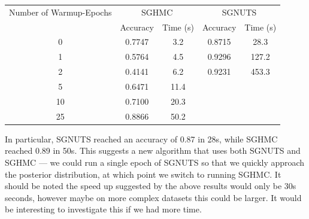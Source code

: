 \begin{center}
\begin{tabular}{ccccc} 
\hline
Number of Warmup-Epochs &\multicolumn{2}{c}{SGHMC}& \multicolumn{2}{c}{SGNUTS} \\
& Accuracy & Time (s) & Accuracy & Time (s) \\
 \hline
 0 &0.7747  &  3.2&0.8715&28.3\\ 
 1 & 0.5764 & 4.5 &0.9296&127.2\\ 
 2 & 0.4141 & 6.2&0.9231&453.3\\ 
 5 &0.6471& 11.4 &&\\ 
 10 &0.7100& 20.3 &&\\ 
 25 &0.8866& 50.2 &&\\ 
 \hline
\end{tabular}
\end{center}

In particular, SGNUTS reached an accuracy of 0.87 in 28s, while SGHMC reached 0.89 in 50s. This suggests a new algorithm that uses both SGNUTS and SGHMC — we could run a single epoch of SGNUTS so that we quickly approach the posterior distribution, at which point we switch to running SGHMC. It should be noted the speed up suggested by the above results would only be 30s seconds, however maybe on more complex datasets this could be larger. It would be interesting to investigate this if we had more time.